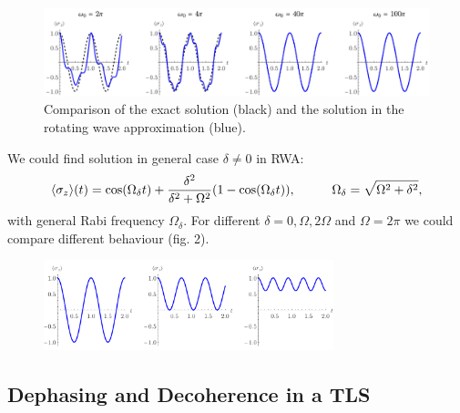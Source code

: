 \begin{figure}[h]
    \centering
    \includegraphics[width=1.0\textwidth]{figs/p23_1.pdf}
    \caption{Comparison of the exact solution (black) and the solution in the rotating wave approximation (blue).}
    \label{fig:rwa}
\end{figure}


We could find solution in general case $\delta \neq 0$ in RWA:
\begin{equation*}
	\langle \sigma_z\rangle(t) = \cos (\Omega_\delta t) + \frac{\delta ^2}{\delta ^2+\Omega ^2}(1-\cos (\Omega_\delta t )),
	\hspace{10 mm} 
	\Omega_\delta = \sqrt{\Omega^2 + \delta^2},
\end{equation*}
with general Rabi frequency $\Omega_\delta$. For different $\delta = 0, \Omega, 2 \Omega$ and $\Omega=2\pi$ we could compare different behaviour (fig. 2).

\begin{figure}[h]
    \centering
    \includegraphics[width=0.75\textwidth]{figs/p23_2.pdf}
    \caption{}
\end{figure}


\subsection{Dephasing and Decoherence in a TLS}

